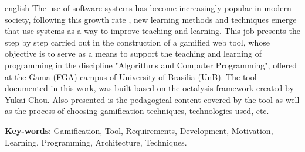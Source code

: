 \begin{resumo}[Abstract]
 \begin{otherlanguage*}{english}
  The use of software systems has become increasingly popular in modern society, following this growth rate
  , new learning methods and techniques emerge that use systems as a way to improve teaching and learning. This job
  presents the step by step carried out in the construction of a gamified web tool, whose objective is to serve as a means
  to support the teaching and learning of programming in the discipline "Algorithms and Computer Programming", offered at the Gama (FGA) campus of
  University of Brasilia (UnB). The tool documented in this work, was built based on the octalysis framework created by Yukai Chou. Also presented is the pedagogical content covered by the tool
  as well as the process of choosing gamification techniques, technologies used, etc.
   \vspace{\onelineskip}
 
   \noindent 
   \textbf{Key-words}: Gamification, Tool, Requirements, Development, Motivation, Learning, Programming, Architecture, Techniques.
 \end{otherlanguage*}
\end{resumo}
